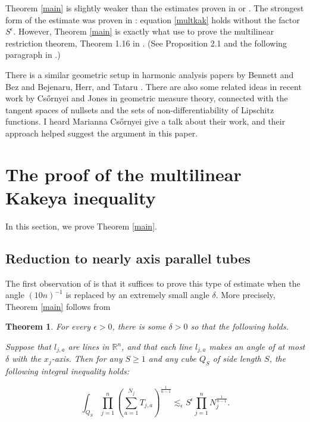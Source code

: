 \documentclass{amsart}
\newtheorem{theorem}[prop]{Theorem}
\newcommand{\eps}{\epsilon}
\newcommand{\RR}{\mathbb{R}}
\begin{document}
Theorem \ref{main} is slightly weaker than the estimates proven in \cite{BCT} or \cite{G}.  The strongest form of the estimate was proven in \cite{G}: equation \ref{multkak} holds without the factor $S^\eps$.  However, Theorem \ref{main} is exactly what \cite{BCT} use to prove the multilinear restriction theorem, Theorem 1.16 in \cite{BCT}.  (See Proposition 2.1 and the following paragraph in \cite{BCT}.)  

There is a similar geometric setup in harmonic analysis papers by Bennett and Bez \cite{BB} and Bejenaru, Herr, and Tataru \cite{BHT}.   There are also some related ideas in recent work by Cs{\H o}rnyei and Jones \cite{CJ} in geometric measure theory, connected with the tangent spaces of nullsets and the sets of non-differentiability of Lipschitz functions.  I heard Marianna Cs{\H o}rnyei give a talk about their work, and their approach helped suggest the argument in this paper.


\section{The proof of the multilinear Kakeya inequality}

In this section, we prove Theorem \ref{main}.

\subsection{Reduction to nearly axis parallel tubes}  \label{subsecreducsmallangle}

The first observation of \cite{BCT} is that it suffices to prove this type of estimate when the angle $(10 n)^{-1}$ is replaced by an extremely small angle $\delta$.   More precisely, Theorem \ref{main} follows from 

\begin{theorem} \label{maindelta} For every $\eps > 0$, there is some $\delta > 0$ so that the following holds.  

Suppose that $l_{j,a}$ are lines in $\RR^n$, and that each line $l_{j,a}$ makes an angle of at most $\delta$ with the $x_j$-axis.  Then for any $S \ge 1$ and any cube $Q_S$ of side length $S$, the following integral inequality holds:

\begin{equation} \label{multkakdelta} \int_{Q_S} \prod_{j=1}^n \left( \sum_{a = 1}^{N_j}  T_{j,a} \right)^{\frac{1}{n-1}}  \lesssim_\eps S^\eps \prod_{j=1}^n N_j^{\frac{1}{n-1}}. 
\end{equation}

\end{theorem}
\end{document}
